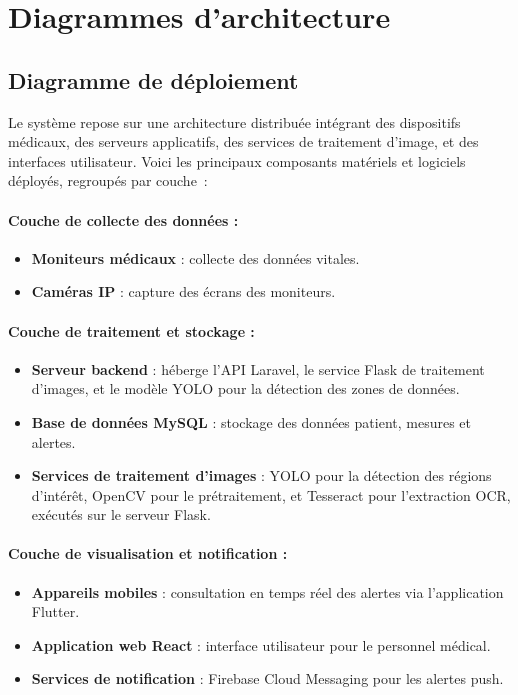 \section{Diagrammes d'architecture}
\label{sec:diagrammes}

\subsection{Diagramme de déploiement}
\label{subsec:deploiement}

Le système repose sur une architecture distribuée intégrant des dispositifs médicaux, des serveurs applicatifs, des services de traitement d’image, et des interfaces utilisateur. Voici les principaux composants matériels et logiciels déployés, regroupés par couche~:

\paragraph{Couche de collecte des données :}
\begin{itemize}
    \item \textbf{Moniteurs médicaux} : collecte des données vitales.
    \item \textbf{Caméras IP} : capture des écrans des moniteurs.
\end{itemize}

\paragraph{Couche de traitement et stockage :}
\begin{itemize}
    \item \textbf{Serveur backend} : héberge l’API Laravel, le service Flask de traitement d’images, et le modèle YOLO pour la détection des zones de données. %
    \item \textbf{Base de données MySQL} : stockage des données patient, mesures et alertes.
    \item \textbf{Services de traitement d’images} : YOLO pour la détection des régions d’intérêt, OpenCV pour le prétraitement, et Tesseract pour l’extraction OCR, exécutés sur le serveur Flask. %
\end{itemize}

\paragraph{Couche de visualisation et notification :}
\begin{itemize}
    \item \textbf{Appareils mobiles} : consultation en temps réel des alertes via l’application Flutter.
    \item \textbf{Application web React} : interface utilisateur pour le personnel médical.
    \item \textbf{Services de notification} : Firebase Cloud Messaging pour les alertes push.
\end{itemize}

